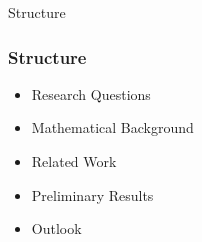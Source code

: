\begin{frame}[label=toc]{Structure}
    \frametitle{Structure}
    \begin{itemize}
        \item Research Questions
        \item Mathematical Background
        \item Related Work
        \item Preliminary Results
        \item Outlook
    \end{itemize}
\end{frame}